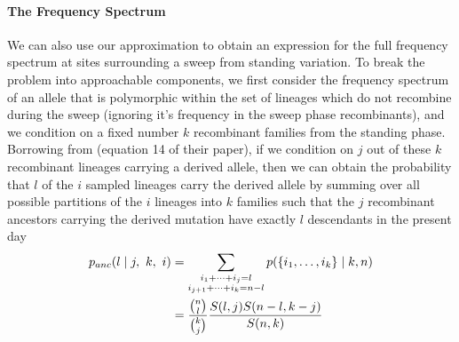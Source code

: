 \documentclass[a4paper,10pt]{article}
\begin{document}
\paragraph{The Frequency Spectrum} We can also use our approximation to obtain an expression for the full frequency spectrum at sites surrounding a sweep from standing variation. To break the problem into approachable components, we first consider the frequency spectrum of an allele that is polymorphic within the set of lineages which do not recombine during the sweep (ignoring it's frequency in the sweep phase recombinants), and we condition on a fixed number $k$ recombinant families from the standing phase. Borrowing from \cite{Pennings2006} (equation 14 of their paper), if we condition on $j$ out of these $k$ recombinant lineages carrying a derived allele, then we can obtain the probability that $l$ of the $i$ sampled lineages carry the derived allele by summing over all possible partitions of the $i$ lineages into $k$ families such that the $j$ recombinant ancestors carrying the derived mutation have exactly $l$ descendants in the present day
\begin{align}
p_{anc}(l \mid j, ~k,~i) 	&= \sum_{\substack{i_1+\cdots +i_j=l \\i_{j+1}+\cdots + i_k=n-l}} p(\{i_1,\dots,i_k\} \mid k, n) \notag \\
					&= \frac{ {n \choose l} }{ {k \choose j} }\frac{ S(l,j)  S(n-l,k-j)  }{ S(n,k) } \label{ESF_gives_freq_spec}
\end{align}
\end{document}
